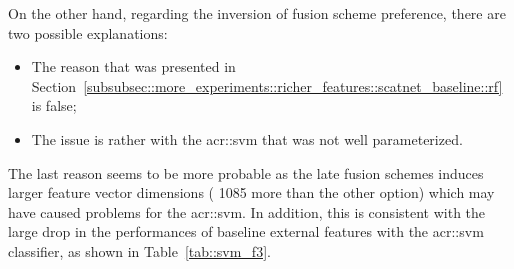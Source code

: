             On the other hand, regarding the inversion of fusion scheme preference, there are two possible explanations:
            \begin{itemize}[label=\(\blacktriangleright\)]
                \item The reason that was presented in Section~\ref{subsubsec::more_experiments::richer_features::scatnet_baseline::rf} is false;
                \item The issue is rather with the \gls{acr::svm} that was not well parameterized.
            \end{itemize}
            The last reason seems to be more probable as the late fusion schemes induces larger feature vector dimensions ( 1085 more than the other option) which may have caused problems for the \gls{acr::svm}.
            In addition, this is consistent with the large drop in the performances of baseline external features with the \gls{acr::svm} classifier, as shown in Table~\ref{tab::svm_f3}.\\

